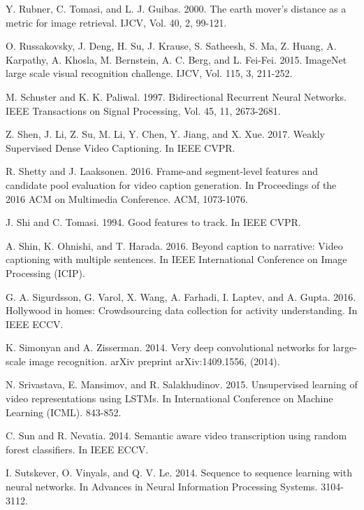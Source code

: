\documentclass[10pt,journal,compsoc]{IEEEtran}
\begin{document}
\begin{thebibliography}{1}
Y. Rubner, C. Tomasi, and L. J. Guibas. 2000. The earth mover's distance as a metric for image retrieval. IJCV, Vol. 40, 2, 99-121.

O. Russakovsky, J. Deng, H. Su, J. Krause, S. Satheesh, S. Ma, Z. Huang, A. Karpathy, A. Khosla, M. Bernstein, A. C. Berg, and L. Fei-Fei. 2015. ImageNet large scale visual recognition challenge. IJCV, Vol. 115, 3, 211-252.

M. Schuster and K. K. Paliwal. 1997. Bidirectional Recurrent Neural Networks. IEEE Transactions on Signal Processing, Vol. 45, 11, 2673-2681.

Z. Shen, J. Li, Z. Su, M. Li, Y. Chen, Y. Jiang, and X. Xue. 2017. Weakly Supervised Dense Video Captioning. In IEEE CVPR.

R. Shetty and J. Laaksonen. 2016. Frame-and segment-level features and candidate pool evaluation for video caption generation. In Proceedings of the 2016 ACM on Multimedia Conference. ACM, 1073-1076.

J. Shi and C. Tomasi. 1994. Good features to track. In IEEE CVPR.

A. Shin, K. Ohnishi, and T. Harada. 2016. Beyond caption to narrative: Video captioning with
multiple sentences. In IEEE International Conference on Image Processing (ICIP).

G. A. Sigurdsson, G. Varol, X. Wang, A. Farhadi, I. Laptev, and A. Gupta. 2016. Hollywood in homes: Crowdsourcing data collection for activity understanding. In IEEE ECCV.

K. Simonyan and A. Zisserman. 2014. Very deep convolutional networks for large-scale image recognition. arXiv preprint arXiv:1409.1556, (2014).

N. Srivastava, E. Mansimov, and R. Salakhudinov. 2015. Unsupervised learning of video representations using LSTMs. In International Conference on Machine Learning (ICML). 843-852.

C. Sun and R. Nevatia. 2014. Semantic aware video transcription using random forest classifiers. In IEEE ECCV.

I. Sutskever, O. Vinyals, and Q. V. Le. 2014. Sequence to sequence learning with neural networks. In Advances in Neural Information Processing Systems. 3104-3112.


\end{thebibliography}
\end{document}
